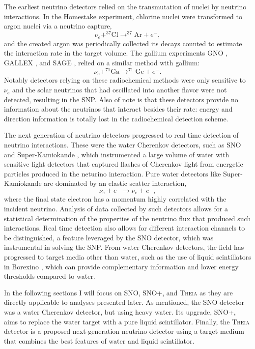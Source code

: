 The earliest neutrino detectors relied on the transmutation of nuclei by neutrino interactions. 
In the Homestake \cite{homestake} experiment, chlorine nuclei were transformed to argon nuclei via a neutrino capture,
\begin{equation}
\nu_e + ^{37}\mathrm{Cl} \rightarrow ^{37}\mathrm{Ar} + e^-,
\end{equation}
and the created argon was periodically collected its decays counted to estimate the interaction rate in the target volume.
The gallium experiments GNO \cite{gno}, GALLEX \cite{gallex}, and SAGE \cite{sagecombo}, relied on a similar method with gallium:
\begin{equation}
\nu_e + ^{71}\mathrm{Ga} \rightarrow ^{71}\mathrm{Ge} + e^-.
\end{equation}
Notably detectors relying on these radiochemical methods were only sensitive to $\nu_e$ and the solar neutrinos that had oscillated into another flavor were not detected, resulting in the SNP.
Also of note is that these detectors provide no information about the neutrinos that interact besides their rate: energy and direction information is totally lost in the radiochemical detection scheme.

The next generation of neutrino detectors progressed to real time detection of neutrino interactions.
These were the water Cherenkov detectors, such as SNO \cite{3phase} and Super-Kamiokande \cite{superk}, which instrumented a large volume of water with sensitive light detectors that captured flashes of Cherenkov light from energetic particles produced in the neturino interaction.
Pure water detectors like Super-Kamiokande are dominated by an elastic scatter interaction,
\begin{equation}
\nu_e + e^- \rightarrow \nu_e + e^-,
\end{equation}
where the final state electron has a momentum highly correlated with the incident neutrino.
Analysis of data collected by such detectors allows for a statistical determination of the properties of the neutrino flux that produced such interactions.
Real time detection also allows for different interaction channels to be distinguished, a feature leveraged by the SNO detector, which was instrumental in solving the SNP.
From water Cherenkov detectors, the field has progressed to target media other than water, such as the use of liquid scintillators in Borexino \cite{borexino}, which can provide complementary information and lower energy thresholds compared to water. 

In the following sections I will focus on SNO, SNO+, and \textsc{Theia} as they are directly applicable to analyses presented later.
As mentioned, the SNO detector was a water Cherenkov detector, but using heavy water. 
Its upgrade, SNO+, aims to replace the water target with a pure liquid scintillator.
Finally, the \textsc{Theia} detector is a proposed next-generation neutrino detector using a target medium that combines the best features of water and liquid scintillator.

